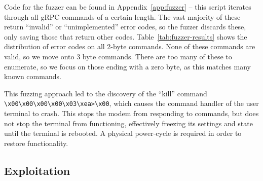 Code for the fuzzer can be found in Appendix~\ref{app:fuzzer} -- this script iterates through all gRPC commands of a certain length.
The vast majority of these return ``invalid'' or ``unimplemented'' error codes, so the fuzzer discards these, only saving those that return other codes.
Table~\ref{tab:fuzzer-results} shows the distribution of error codes on all 2-byte commands.
None of these commands are valid, so we move onto 3 byte commands.
There are too many of these to enumerate, so we focus on those ending with a zero byte, as this matches many known commands.

This fuzzing approach led to the discovery of the ``kill'' command \lstinline{\x00\x00\x00\x00\x03\xea>\x00}, which causes the command handler of the user terminal to crash.
This stops the modem from responding to commands, but does not stop the terminal from functioning, effectively freezing its settings and state until the terminal is rebooted.
A physical power-cycle is required in order to restore functionality.


\subsection{Exploitation}\label{sec:exploitation}

